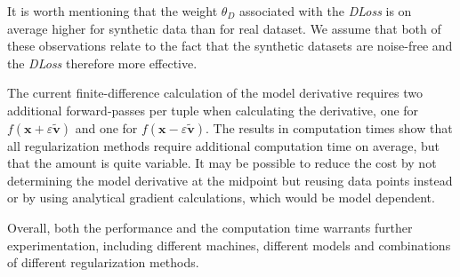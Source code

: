 \documentclass[conference]{IEEEtran}
\begin{document}
It is worth mentioning that the weight $\theta_{D}$ associated with the \emph{DLoss} is on average higher for synthetic data than for real dataset.
We assume that both of these observations relate to the fact that the synthetic datasets are noise-free and the \emph{DLoss} therefore more effective.  

The current finite-difference calculation of the model derivative requires two additional forward-passes per tuple when calculating the derivative, one for $f(\mathbf{x}+\varepsilon\tilde{\mathbf{v}})$ and one for $f(\mathbf{x}-\varepsilon\tilde{\mathbf{v}})$. 
The results in computation times show that all regularization methods require additional computation time on average, but that the amount is quite variable.
It may be possible to reduce the cost by not determining the model derivative at the midpoint but reusing data points instead or by using analytical gradient calculations, which would be model dependent. 

Overall, both the performance and the computation time warrants further experimentation, including different machines, different models and combinations of different regularization methods. 
\end{document}
